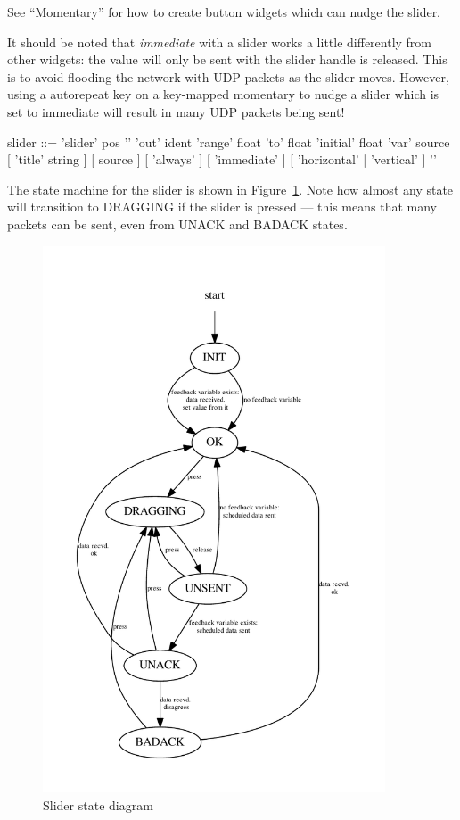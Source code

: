 See ``Momentary'' for how to create button widgets which can nudge the slider.

It should be noted that \emph{immediate} with a slider works a little
differently from other widgets: the value will only be sent with the slider
handle is released. This is to avoid flooding the network with UDP packets as
the slider moves. However, using a autorepeat key on a key-mapped momentary
to nudge a slider which is set to immediate will result in many UDP packets
being sent!

\begin{v}
slider      ::= 'slider' pos '{'
                    'out' ident
                    'range' float 'to' float
                    'initial' float
                    'var' source
                    [ 'title' string ]
                    [ source ]
                    [ 'always' ]
                    [ 'immediate' ]
                    [ 'horizontal' | 'vertical' ]
                '}'
\end{v}
The state machine for the slider is shown in Figure~\ref{sliderstate}. Note how
almost any state will transition to DRAGGING if the slider is pressed --- this means
that many packets can be sent, even from UNACK and BADACK states.

\begin{figure}[ht]
\center
\includegraphics[width=4in]{stateSlider.pdf}
\caption{Slider state diagram}
\label{sliderstate}
\end{figure}

